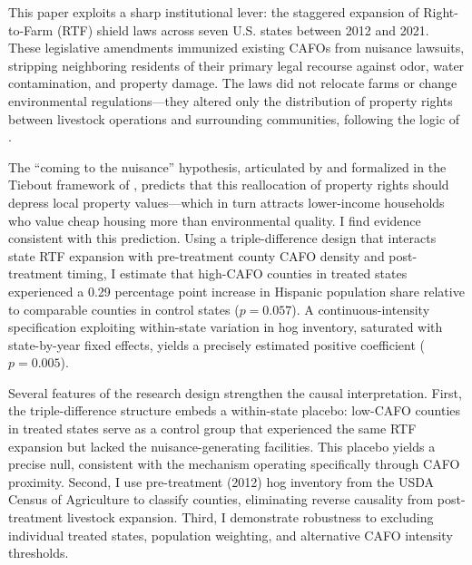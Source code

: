 \documentclass[12pt]{article}
\begin{document}
This paper exploits a sharp institutional lever: the staggered expansion of Right-to-Farm (RTF) shield laws across seven U.S. states between 2012 and 2021. These legislative amendments immunized existing CAFOs from nuisance lawsuits, stripping neighboring residents of their primary legal recourse against odor, water contamination, and property damage. The laws did not relocate farms or change environmental regulations---they altered only the distribution of property rights between livestock operations and surrounding communities, following the logic of \citet{coase1960problem}.

The ``coming to the nuisance'' hypothesis, articulated by \citet{banzhaf2019environmental} and formalized in the Tiebout framework of \citet{tiebout1956pure}, predicts that this reallocation of property rights should depress local property values---which in turn attracts lower-income households who value cheap housing more than environmental quality. I find evidence consistent with this prediction. Using a triple-difference design that interacts state RTF expansion with pre-treatment county CAFO density and post-treatment timing, I estimate that high-CAFO counties in treated states experienced a 0.29 percentage point increase in Hispanic population share relative to comparable counties in control states ($p = 0.057$). A continuous-intensity specification exploiting within-state variation in hog inventory, saturated with state-by-year fixed effects, yields a precisely estimated positive coefficient ($p = 0.005$).

Several features of the research design strengthen the causal interpretation. First, the triple-difference structure embeds a within-state placebo: low-CAFO counties in treated states serve as a control group that experienced the same RTF expansion but lacked the nuisance-generating facilities. This placebo yields a precise null, consistent with the mechanism operating specifically through CAFO proximity. Second, I use pre-treatment (2012) hog inventory from the USDA Census of Agriculture to classify counties, eliminating reverse causality from post-treatment livestock expansion. Third, I demonstrate robustness to excluding individual treated states, population weighting, and alternative CAFO intensity thresholds.
\end{document}
